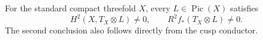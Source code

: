 \begin{corollary}
\hypertarget{tag-03IV}{}\label{wbII:test:cdp-comparison}


For the standard compact threefold $X$, every $L\in\operatorname{Pic}(X)$
satisfies
\[
 H^2(X,T_X\otimes L)\ne0,
 \qquad R^2f_*(T_X\otimes L)\ne0.
\]
The second conclusion also follows directly from the cusp conductor.
\end{corollary}
